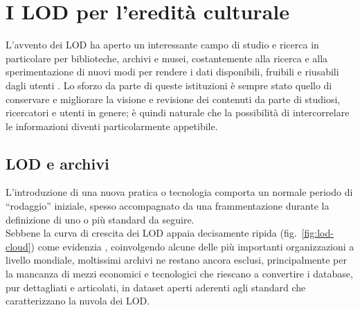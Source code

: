 \section{I LOD per l'eredità culturale}

L'avvento dei LOD ha aperto un interessante campo di studio e ricerca in particolare per biblioteche, archivi e musei, costantemente alla ricerca  e alla sperimentazione di nuovi modi per rendere i dati disponibili, fruibili e riusabili dagli utenti \cite{5}. Lo sforzo da parte di queste istituzioni è sempre stato quello di conservare e migliorare la visione e revisione dei contenuti da parte di studiosi, ricercatori e utenti in genere; è quindi naturale che la possibilità di intercorrelare le informazioni diventi particolarmente appetibile.

\subsection{LOD e archivi}
L'introduzione di una nuova pratica o tecnologia comporta un normale periodo di ``rodaggio'' iniziale, spesso accompagnato da una frammentazione durante la definizione di uno o più standard da seguire.\\
Sebbene la curva di crescita dei LOD appaia decisamente ripida (fig.~\ref{fig:lod-cloud}) come evidenzia \cite{21}, coinvolgendo alcune delle più importanti organizzazioni a livello mondiale, moltissimi archivi ne restano ancora esclusi, principalmente per la mancanza di mezzi economici e tecnologici che riescano a convertire i database, pur dettagliati e articolati, in dataset aperti aderenti agli standard che caratterizzano la nuvola dei LOD.

